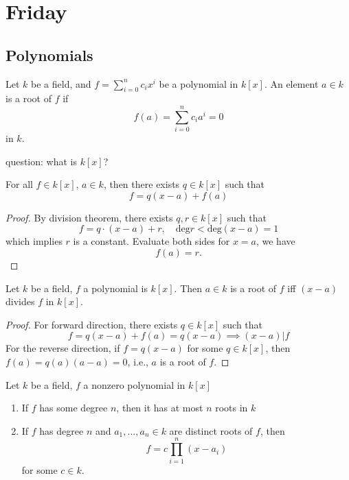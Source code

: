 \section{Friday}

\subsection{Polynomials}
\begin{definition}[polynomial]
Let $k$ be a field, and $f=\sum_{i=0}^nc_ix^i$ be a polynomial in $k[x]$. An element $a\in k$ is a root of $f$ if
\[
f(a)=\sum_{i=0}^nc_ia^i=0
\]
in $k$.
\end{definition}
question: what is $k[x]$?
\begin{corollary}
For all $f\in k[x]$, $a\in k$, then there exists $q\in k[x]$ such that
\[
f=q(x-a)+f(a)
\]
\end{corollary}
\begin{proof}
By division theorem, there exists $q,r\in k[x]$ such that
\[
f=q\cdot (x-a)+r,\quad
\mbox{deg}r<\mbox{deg}(x-a)=1
\]
which implies $r$ is a constant. Evaluate both sides for $x=a$, we have
\[
f(a)=r.
\]
\end{proof}
\begin{proposition}
Let $k$ be a field, $f$ a polynomial is $k[x]$. Then $a\in k$ is a root of $f$ iff $(x-a)$ divides $f$ in $k[x]$.
\end{proposition}
\begin{proof}
For forward direction, there exists $q\in k[x]$ such that
\[
f=q(x-a)+f(a)=q(x-a)\implies (x-a)|f
\]
For the reverse direction, if $f=q(x-a)$ for some $q\in k[x]$, then $f(a)=q(a)(a-a)=0$, i.e., $a$ is a root of $f$.
\end{proof}
\begin{theorem}
Let $k$ be a field, $f$ a nonzero polynomial in $k[x]$
\begin{enumerate}
\item
If $f$ has some degree $n$, then it has at most $n$ roots in $k$
\item
If $f$ has degree $n$ and $a_1,\dots,a_n\in k$ are distinct roots of $f$, then
\[
f=c\prod_{i=1}^n(x-a_i)
\]
for some $c\in k$.
\end{enumerate}
\end{theorem}
